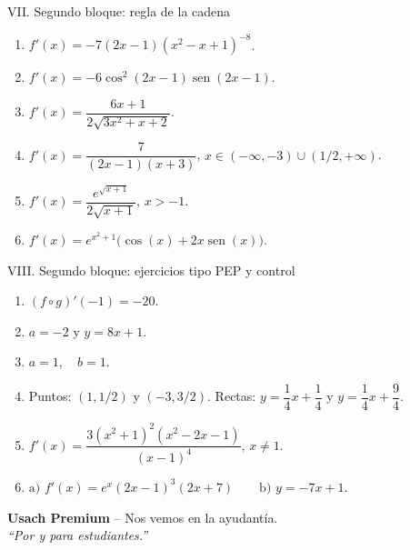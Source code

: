 \documentclass[letterpaper,12pt]{article}
\newcommand{\sen}{\operatorname{sen}}
\begin{document}
\begin{respuestasbox}{VII. Segundo bloque: regla de la cadena}
\begin{enumerate}[label=\color{azulFuerte}\textbf{\arabic*.},leftmargin=*,start=29,itemsep=0.8em]
    \item \(\boxed{f'(x)=-7(2x-1)(x^2-x+1)^{-8}}\).
    \item \(\boxed{f'(x)=-6\cos^2(2x-1)\sen(2x-1)}\).
    \item \(\boxed{f'(x)=\dfrac{6x+1}{2\sqrt{3x^2+x+2}}}\).
    \item \(\boxed{f'(x)=\dfrac{7}{(2x-1)(x+3)}}\), \(x\in(-\infty,-3)\cup(1/2,+\infty)\).
    \item \(\boxed{f'(x)=\dfrac{e^{\sqrt{x+1}}}{2\sqrt{x+1}}}\), \(x>-1\).
    \item \(\boxed{f'(x)=e^{x^2+1}\bigl(\cos(x)+2x\sen(x)\bigr)}\).
\end{enumerate}
\end{respuestasbox}

\begin{respuestasbox}{VIII. Segundo bloque: ejercicios tipo PEP y control}
\begin{enumerate}[label=\color{azulFuerte}\textbf{\arabic*.},leftmargin=*,start=35,itemsep=0.9em]
    \item \(\boxed{(f\circ g)'(-1)=-20}\).
    \item \(\boxed{a=-2}\) y \(\boxed{y=8x+1}\).
    \item \(\boxed{a=1,\quad b=1}\).
    \item Puntos: \(\boxed{(1,1/2)}\) y \(\boxed{(-3,3/2)}\). Rectas: \(\boxed{y=\dfrac14x+\dfrac14}\) y \(\boxed{y=\dfrac14x+\dfrac94}\).
    \item \(\boxed{f'(x)=\dfrac{3(x^2+1)^2(x^2-2x-1)}{(x-1)^4}}\), \(x\neq1\).
    \item \(\boxed{\text{a) }f'(x)=e^x(2x-1)^3(2x+7)\qquad \text{b) }y=-7x+1}\).
\end{enumerate}
\end{respuestasbox}

\vspace{0.6cm}
\begin{center}
    \small\textbf{Usach Premium} -- Nos vemos en la ayudantía.\\
    \textit{``Por y para estudiantes.''}
\end{center}
\end{document}
